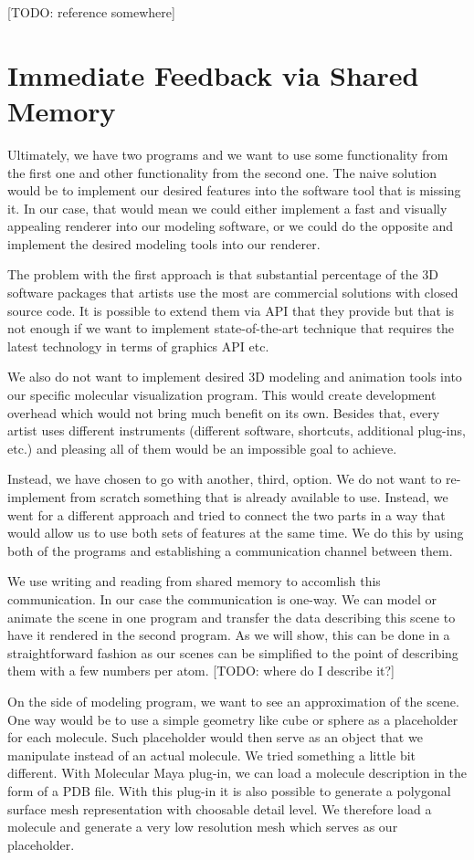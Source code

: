 \documentclass[
  digital, %
  table,   %
  nolof,     %
  nolot,     %
  oneside,
]{fithesis3}
\begin{document}
[TODO: reference somewhere]

\section{Immediate Feedback via Shared Memory}
Ultimately, we have two programs and we want to use some functionality from the first one and other functionality from the second one. The naive solution would be to implement our desired features into the software tool that is missing it. In our case, that would mean we could either implement a fast and visually appealing renderer into our modeling software, or we could do the opposite and implement the desired modeling tools into our renderer.

The problem with the first approach is that substantial percentage of the 3D software packages that artists use the most are commercial solutions with closed source code. It is possible to extend them via API that they provide but that is not enough if we want to implement state-of-the-art technique that requires the latest technology in terms of graphics API etc.

We also do not want to implement desired 3D modeling and animation tools into our specific molecular visualization program. This would create development overhead which would not bring much benefit on its own. Besides that, every artist uses different instruments (different software, shortcuts, additional plug-ins, etc.) and pleasing all of them would be an impossible goal to achieve.

Instead, we have chosen to go with another, third, option. We do not want to re-implement from scratch something that is already available to use. Instead, we went for a different approach and tried to connect the two parts in a way that would allow us to use both sets of features at the same time. We do this by using both of the programs and establishing a communication channel between them.

We use writing and reading from shared memory to accomlish this communication. In our case the communication is one-way. We can model or animate the scene in one program and transfer the data describing this scene to have it rendered in the second program. As we will show, this can be done in a straightforward fashion as our scenes can be simplified to the point of describing them with a few numbers per atom. [TODO: where do I describe it?]

On the side of modeling program, we want to see an approximation of the scene. One way would be to use a simple geometry like cube or sphere as a placeholder for each molecule. Such placeholder would then serve as an object that we manipulate instead of an actual molecule. We tried something a little bit different. With Molecular Maya plug-in, we can load a molecule description in the form of a PDB file. With this plug-in it is also possible to generate a polygonal surface mesh representation with choosable detail level. We therefore load a molecule and generate a very low resolution mesh which serves as our placeholder.
\end{document}
